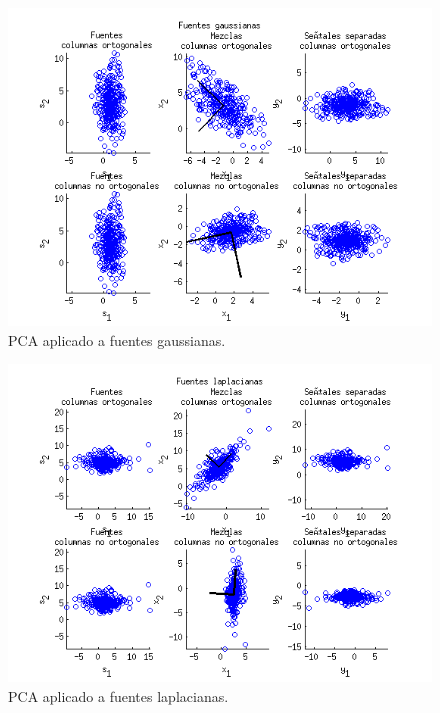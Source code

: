 \documentclass[11pt,a4paper,final]{article}
\begin{document}
\begin{figure}
\includegraphics [width=\textwidth]{Ejercicio3_01.png}
\caption{PCA aplicado a fuentes gaussianas.}
\label{fig:ejercicio331}
\end{figure}
\begin{figure}
\includegraphics [width=\textwidth]{Ejercicio3_02.png}
\caption{PCA aplicado a fuentes laplacianas.}
\label{fig:ejercicio332}
\end{figure}
\end{document}
